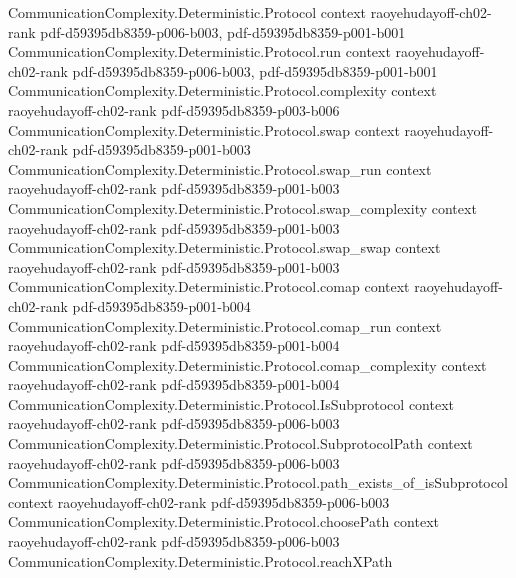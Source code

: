 \begin{theorem}
\label{CommunicationComplexity.Deterministic.Rank.rank_rectMatrix_le_one}
\leanok
{}
\proofstep
  {CommunicationComplexity.Deterministic.Protocol}
  {context}
  {raoyehudayoff-ch02-rank}
  {pdf-d59395db8359-p006-b003,
    pdf-d59395db8359-p001-b001}
\proofstep
  {CommunicationComplexity.Deterministic.Protocol.run}
  {context}
  {raoyehudayoff-ch02-rank}
  {pdf-d59395db8359-p006-b003,
    pdf-d59395db8359-p001-b001}
\proofstep
  {CommunicationComplexity.Deterministic.Protocol.complexity}
  {context}
  {raoyehudayoff-ch02-rank}
  {pdf-d59395db8359-p003-b006}
\proofstep
  {CommunicationComplexity.Deterministic.Protocol.swap}
  {context}
  {raoyehudayoff-ch02-rank}
  {pdf-d59395db8359-p001-b003}
\proofstep
  {CommunicationComplexity.Deterministic.Protocol.swap_run}
  {context}
  {raoyehudayoff-ch02-rank}
  {pdf-d59395db8359-p001-b003}
\proofstep
  {CommunicationComplexity.Deterministic.Protocol.swap_complexity}
  {context}
  {raoyehudayoff-ch02-rank}
  {pdf-d59395db8359-p001-b003}
\proofstep
  {CommunicationComplexity.Deterministic.Protocol.swap_swap}
  {context}
  {raoyehudayoff-ch02-rank}
  {pdf-d59395db8359-p001-b003}
\proofstep
  {CommunicationComplexity.Deterministic.Protocol.comap}
  {context}
  {raoyehudayoff-ch02-rank}
  {pdf-d59395db8359-p001-b004}
\proofstep
  {CommunicationComplexity.Deterministic.Protocol.comap_run}
  {context}
  {raoyehudayoff-ch02-rank}
  {pdf-d59395db8359-p001-b004}
\proofstep
  {CommunicationComplexity.Deterministic.Protocol.comap_complexity}
  {context}
  {raoyehudayoff-ch02-rank}
  {pdf-d59395db8359-p001-b004}
\proofstep
  {CommunicationComplexity.Deterministic.Protocol.IsSubprotocol}
  {context}
  {raoyehudayoff-ch02-rank}
  {pdf-d59395db8359-p006-b003}
\proofstep
  {CommunicationComplexity.Deterministic.Protocol.SubprotocolPath}
  {context}
  {raoyehudayoff-ch02-rank}
  {pdf-d59395db8359-p006-b003}
\proofstep
  {CommunicationComplexity.Deterministic.Protocol.path_exists_of_isSubprotocol}
  {context}
  {raoyehudayoff-ch02-rank}
  {pdf-d59395db8359-p006-b003}
\proofstep
  {CommunicationComplexity.Deterministic.Protocol.choosePath}
  {context}
  {raoyehudayoff-ch02-rank}
  {pdf-d59395db8359-p006-b003}
\proofstep
  {CommunicationComplexity.Deterministic.Protocol.reachXPath}

\end{theorem}
